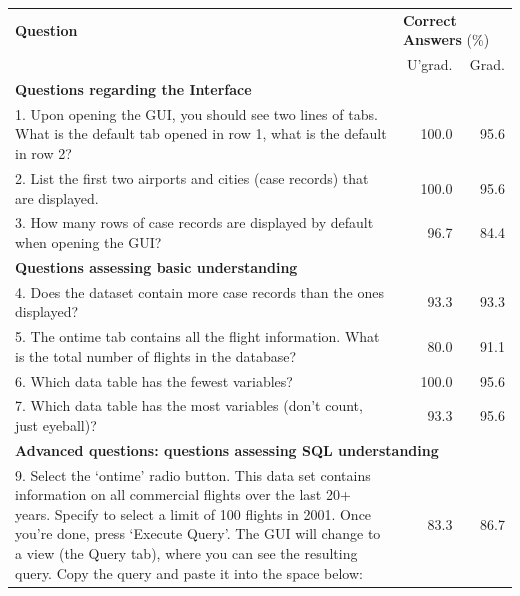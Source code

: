\documentclass[11pt]{tise_style}
\begin{document}
\begin{table}[htbp]
   \centering
   \begin{tabular}{p{4.5in}rr} %
      \toprule
	\textbf{Question}  & \multicolumn{2}{l}{\textbf{Correct Answers} (\%)} \\
      \cmidrule{2-3}
 & U'grad. & Grad. \\ 
  \cmidrule(l){1-3}
\multicolumn{3}{l}{\textbf{Questions regarding the Interface}}\\
  \cmidrule(l){1-3}
  \footnotesize
1. Upon opening the GUI, you should see two lines of tabs.  What is the default tab opened in row 1, what is the default in row 2? & \footnotesize 100.0 & \footnotesize 95.6 \\ 
\footnotesize 2. List the first two airports and cities (case records) that are displayed.  & \footnotesize 100.0 & \footnotesize 95.6 \\ 
\footnotesize 3. How many rows of case records are displayed by default when opening the GUI?  & \footnotesize 96.7 & \footnotesize 84.4 \\ 
  \cmidrule(l){1-3}
\multicolumn{3}{l}{\textbf{Questions assessing basic understanding}}\\
  \cmidrule(l){1-3}
\footnotesize 4. Does the dataset contain more case records than the ones displayed? & \footnotesize 93.3 & \footnotesize 93.3 \\ 
\footnotesize 5. The ontime tab contains all the flight information. What is the total number of flights in the database?  & \footnotesize 80.0 & \footnotesize 91.1 \\ 
\footnotesize 6. Which data table has the fewest variables?  & \footnotesize 100.0 & \footnotesize 95.6 \\ 
\footnotesize 7. Which data table has the most variables (don't count, just eyeball)? & \footnotesize 93.3 & \footnotesize 95.6 \\ 
  \cmidrule(l){1-3}
\multicolumn{3}{l}{\textbf{Advanced questions: questions assessing SQL understanding}}\\
  \cmidrule(l){1-3}
\footnotesize 9. Select the `ontime' radio button. This data set contains information on all commercial flights over the last 20+ years. Specify to select a limit of 100 flights in 2001. Once you're done, press `Execute Query'. The GUI will change to a view (the Query tab), where you can see the resulting query. Copy the query and paste it into the space below: & \footnotesize 83.3 & \footnotesize 86.7 \\

\end{tabular}
\end{table}
\end{document}
